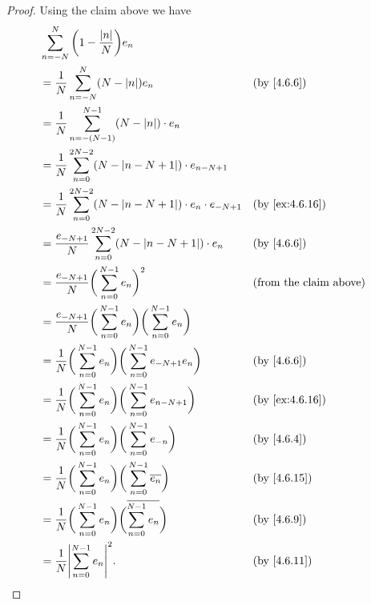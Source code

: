 \begin{proof}
  Using the claim above we have
  \begin{align*}
     & \sum_{n = -N}^N \bigg(1 - \dfrac{\abs{n}}{N}\bigg) e_n                                                                                 \\
     & = \dfrac{1}{N} \sum_{n = -N}^N (N - \abs{n}) e_n                                                    &  & \by{4.6.6}                    \\
     & = \dfrac{1}{N} \sum_{n = -(N - 1)}^{N - 1} (N - \abs{n}) \cdot e_n                                                                     \\
     & = \dfrac{1}{N} \sum_{n = 0}^{2N - 2} (N - \abs{n - N + 1}) \cdot e_{n - N + 1}                                                         \\
     & = \dfrac{1}{N} \sum_{n = 0}^{2N - 2} (N - \abs{n - N + 1}) \cdot e_n \cdot e_{-N + 1}               &  & \by{ex:4.6.16}                \\
     & = \dfrac{e_{-N + 1}}{N} \sum_{n = 0}^{2N - 2} (N - \abs{n - N + 1}) \cdot e_n                       &  & \by{4.6.6}                    \\
     & = \dfrac{e_{-N + 1}}{N} \bigg(\sum_{n = 0}^{N - 1} e_n\bigg)^2                                      &  & \text{(from the claim above)} \\
     & = \dfrac{e_{-N + 1}}{N} \bigg(\sum_{n = 0}^{N - 1} e_n\bigg) \bigg(\sum_{n = 0}^{N - 1} e_n\bigg)                                      \\
     & = \dfrac{1}{N} \bigg(\sum_{n = 0}^{N - 1} e_n\bigg) \bigg(\sum_{n = 0}^{N - 1} e_{-N + 1} e_n\bigg) &  & \by{4.6.6}                    \\
     & = \dfrac{1}{N} \bigg(\sum_{n = 0}^{N - 1} e_n\bigg) \bigg(\sum_{n = 0}^{N - 1} e_{n - N + 1}\bigg)  &  & \by{ex:4.6.16}                \\
     & = \dfrac{1}{N} \bigg(\sum_{n = 0}^{N - 1} e_n\bigg) \bigg(\sum_{n = 0}^{N - 1} e_{-n}\bigg)         &  & \by{4.6.4}                    \\
     & = \dfrac{1}{N} \bigg(\sum_{n = 0}^{N - 1} e_n\bigg) \bigg(\sum_{n = 0}^{N - 1} \overline{e_n}\bigg) &  & \by{4.6.15}                   \\
     & = \dfrac{1}{N} \bigg(\sum_{n = 0}^{N - 1} e_n\bigg) \bigg(\overline{\sum_{n = 0}^{N - 1} e_n}\bigg) &  & \by{4.6.9}                    \\
     & = \dfrac{1}{N} \abs{\sum_{n = 0}^{N - 1} e_n}^2.                                                    &  & \by{4.6.11}
  \end{align*}
\end{proof}


